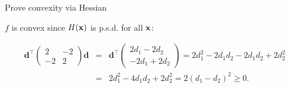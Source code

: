 \begin{vbframe}{Prove convexity via Hessian}
\begin{footnotesize}

$f$ is convex since $H(\mathbf{x})$ is p.s.d. for all $\mathbf{x}$:

\begin{eqnarray*}
\mathbf{d}^{\top}\begin{pmatrix} 2 & -2 \\ -2 & 2 \end{pmatrix}\mathbf{d} &=& \mathbf{d}^{\top} \begin{pmatrix} 2d_1 - 2d_2 \\ -2d_1 + 2d_2\end{pmatrix} = 2d_1^2 - 2d_1d_2 -2d_1d_2 + 2d_2^2 \\ &=& 2d_1^2 - 4d_1d_2 + 2d_2^2 = 2 (d_1 - d_2)^2 \ge 0.
\end{eqnarray*}


\end{footnotesize}

\end{vbframe}



